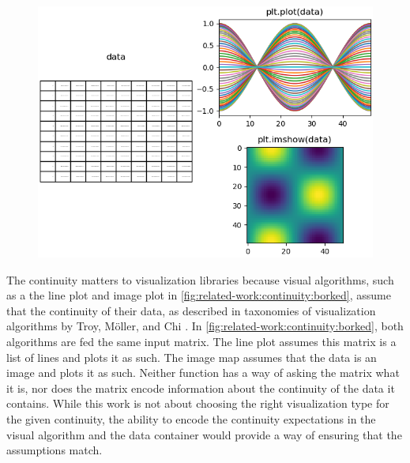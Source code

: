 \documentclass[10pt,journal,compsoc]{IEEEtran}
\theoremstyle{definition}
\theoremstyle{remark}
\begin{document}
\begin{figure}[h!]
  \label{fig:related-work:continuity:borked}
  \includegraphics[width=1\columnwidth]{continuity.png}
\end{figure}
The continuity matters to visualization libraries because visual algorithms, such as a the line plot and image plot in \autoref{fig:related-work:continuity:borked}, assume that the continuity of their data, as described in taxonomies of visualization algorithms by Troy, M\"{o}ller, and Chi \cite{toryRethinkingVisualizationHighlevel2004,chiTaxonomyVisualizationTechniques2000}. In \autoref{fig:related-work:continuity:borked}, both algorithms are fed the same input matrix. The line plot assumes this matrix is a list of lines and plots it as such. The image map assumes that the data is an image and plots it as such. Neither function has a way of asking the matrix what it is, nor does the matrix encode information about the continuity of the data it contains. While this work is not about choosing the right visualization type for the given continuity, the ability to encode the continuity expectations in the visual algorithm and the data container would provide a way of ensuring that the assumptions match. 
\end{document}
